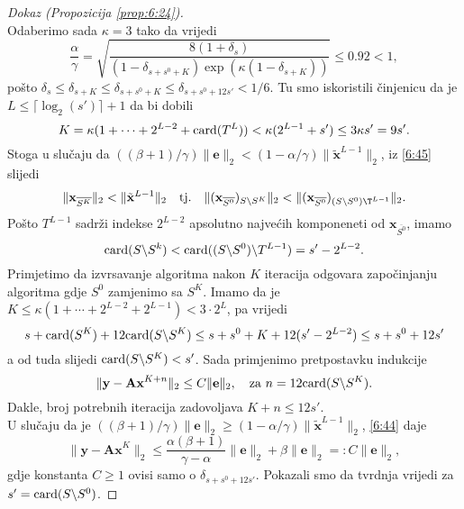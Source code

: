 \documentclass[a4paper,twoside,12pt]{memoir} %
\newcommand{\vect}[1]{\mathbf{#1}}
\renewcommand{\vec}{\vect}
\newcommand{\card}{\text{\normalfont{card}}}
\newcommand{\norm}[1]{\|{#1}\|}
\begin{document}
\begin{proof}[Dokaz (Propozicija \ref{prop:6:24})]
\begin{equation}
    \end{equation}
    Odaberimo sada $\kappa = 3$ tako da vrijedi
    \begin{equation*}
        \frac{\alpha}{\gamma} = \sqrt{\frac{8(1+\delta_s)}{(1-\delta_{s+s^0+K}) \exp(\kappa(1-\delta_{s+K}))}}  \leq 0.92 < 1,
    \end{equation*}
    po\v{s}to $\delta_s \leq \delta_{s+K} \leq \delta_{s+s^0+K} \leq \delta_{s+s^0+12s'} < 1/6$. Tu smo iskoristili \v{c}injenicu da je $L \leq \lceil \log_2(s') \rceil + 1$ da bi dobili
    \begin{equation*}
        K = \kappa(1+\cdots+2^{L-2} + \card(T^L)) < \kappa(2^{L-1}+s')\leq 3 \kappa s' = 9 s'.
    \end{equation*}
    Stoga u slu\v{c}aju da $((\beta+1)/\gamma)\norm{\vec e}_2 < (1- \alpha/\gamma) \norm{\tilde{\vec x}^{L-1}}_2$, iz \eqref{6:45} slijedi
    \begin{equation*}
        \norm{\vec x_{\overline{S^K}}}_2 < \norm{\tilde{\vec x}^{L-1}}_2 \quad \text{tj.} \quad \norm{(\vec x_{\overline{S^0}})_{S \backslash S^K}}_2 < \norm{(\vec x_{\overline{S^0}})_{(S \backslash S^0)\T^{L-1}}}_2.
    \end{equation*}
    Po\v{s}to $T^{L-1}$ sadr\v{z}i indekse $2^{L-2}$ apsolutno najve\'cih komponeneti od $\vec x_{\overline{S^0}}$, imamo
    \begin{equation*}
    \card(S \backslash S^k)< \card((S \backslash S^0) \backslash T^{L-1}) = s' - 2^{L-2}.
    \end{equation*}
    Primjetimo da izvrsavanje algoritma nakon $K$ iteracija odgovara zapo\v{c}injanju algoritma gdje $S^0$ zamjenimo sa $S^K$. Imamo da je $K \leq \kappa (1+\cdots+2^{L-2}+2^{L-1}) < 3 \cdot 2^L$, pa vrijedi
    \begin{equation*}
        s + \card(S^K)+12 \card(S \backslash S^K) \leq s + s^0 + K + 12(s' - 2^{L-2}) \leq s+ s^0 + 12s'
    \end{equation*}
    a od tuda slijedi $\card(S \backslash S^K) < s'$. Sada primjenimo pretpostavku indukcije
    \begin{equation*}
        \norm{\vec y - \vec{Ax}^{K+n}}_2 \leq C \norm{\vec e}_2, \quad \text{za } n=12\card(S \backslash S^K).
    \end{equation*}
    Dakle, broj potrebnih iteracija zadovoljava $K+n \leq 12s'$.\\
    U slu\v{c}aju da je $((\beta + 1)/\gamma)\norm{\vec e}_2 \geq (1-\alpha/\gamma)\norm{\tilde{\vec x}^{L-1}}_2$, \eqref{6:44} daje
    \begin{equation*}
        \norm{\vec y - \vec{Ax}^K}_2 \leq \frac{\alpha(\beta+1)}{\gamma - \alpha} \norm{\vec e}_2 + \beta \norm{\vec e}_2 =: C \norm{\vec e}_2,
    \end{equation*}
    gdje konstanta $C \geq 1$ ovisi samo o $\delta_{s+s^0+12s'}$. Pokazali smo da tvrdnja vrijedi za $s' = \card(S \backslash S^0)$.
\end{proof}
\end{document}
